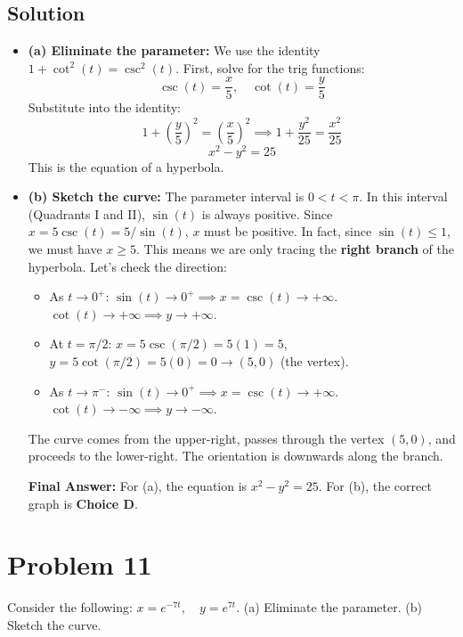 \documentclass{article}
\begin{document}
\subsection*{Solution}
\begin{itemize}
    \item \textbf{(a) Eliminate the parameter:}
    We use the identity $1 + \cot^2(t) = \csc^2(t)$.
    First, solve for the trig functions:
    \[ \csc(t) = \frac{x}{5}, \quad \cot(t) = \frac{y}{5} \]
    Substitute into the identity:
    \[ 1 + \left(\frac{y}{5}\right)^2 = \left(\frac{x}{5}\right)^2 \implies 1 + \frac{y^2}{25} = \frac{x^2}{25} \]
    \[ x^2 - y^2 = 25 \]
    This is the equation of a hyperbola.

    \item \textbf{(b) Sketch the curve:}
    The parameter interval is $0 < t < \pi$. In this interval (Quadrants I and II), $\sin(t)$ is always positive.
    Since $x = 5 \csc(t) = 5/\sin(t)$, $x$ must be positive. In fact, since $\sin(t) \le 1$, we must have $x \ge 5$. This means we are only tracing the \textbf{right branch} of the hyperbola.
    Let's check the direction:
    \begin{itemize}
        \item As $t \to 0^+$: $\sin(t) \to 0^+ \implies x = \csc(t) \to +\infty$. $\cot(t) \to +\infty \implies y \to +\infty$.
        \item At $t=\pi/2$: $x=5\csc(\pi/2)=5(1)=5$, $y=5\cot(\pi/2)=5(0)=0 \rightarrow (5, 0)$ (the vertex).
        \item As $t \to \pi^-$: $\sin(t) \to 0^+ \implies x = \csc(t) \to +\infty$. $\cot(t) \to -\infty \implies y \to -\infty$.
    \end{itemize}
    The curve comes from the upper-right, passes through the vertex $(5, 0)$, and proceeds to the lower-right. The orientation is downwards along the branch.

    \textbf{Final Answer:} For (a), the equation is $x^2 - y^2 = 25$. For (b), the correct graph is \textbf{Choice D}.
\end{itemize}

\section{Problem 11}
Consider the following: $x = e^{-7t}, \quad y = e^{7t}$.
(a) Eliminate the parameter.
(b) Sketch the curve.
\end{document}
